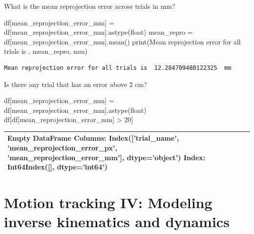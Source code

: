 \documentclass[
  letterpaper,
  DIV=11,
  numbers=noendperiod]{scrreprt}
\newenvironment{Shaded}{\begin{snugshade}}{\end{snugshade}}
\newcommand{\BuiltInTok}[1]{\textcolor[rgb]{0.00,0.23,0.31}{#1}}
\newcommand{\DecValTok}[1]{\textcolor[rgb]{0.68,0.00,0.00}{#1}}
\newcommand{\NormalTok}[1]{\textcolor[rgb]{0.00,0.23,0.31}{#1}}
\newcommand{\OperatorTok}[1]{\textcolor[rgb]{0.37,0.37,0.37}{#1}}
\newcommand{\StringTok}[1]{\textcolor[rgb]{0.13,0.47,0.30}{#1}}
\begin{document}
What is the mean reprojection error across trials in mm?

\begin{Shaded}
\begin{Highlighting}[]
\NormalTok{df[}\StringTok{\textquotesingle{}mean\_reprojection\_error\_mm\textquotesingle{}}\NormalTok{] }\OperatorTok{=}\NormalTok{ df[}\StringTok{\textquotesingle{}mean\_reprojection\_error\_mm\textquotesingle{}}\NormalTok{].astype(}\BuiltInTok{float}\NormalTok{)}
\NormalTok{mean\_repro }\OperatorTok{=}\NormalTok{ df[}\StringTok{\textquotesingle{}mean\_reprojection\_error\_mm\textquotesingle{}}\NormalTok{].mean()}
\BuiltInTok{print}\NormalTok{(}\StringTok{\textquotesingle{}Mean reprojection error for all trials is \textquotesingle{}}\NormalTok{, mean\_repro, }\StringTok{\textquotesingle{} mm\textquotesingle{}}\NormalTok{)}
\end{Highlighting}
\end{Shaded}

\begin{verbatim}
Mean reprojection error for all trials is  12.284709480122325  mm
\end{verbatim}

Is there any trial that has an error above 2 cm?

\begin{Shaded}
\begin{Highlighting}[]
\NormalTok{df[}\StringTok{\textquotesingle{}mean\_reprojection\_error\_mm\textquotesingle{}}\NormalTok{] }\OperatorTok{=}\NormalTok{ df[}\StringTok{\textquotesingle{}mean\_reprojection\_error\_mm\textquotesingle{}}\NormalTok{].astype(}\BuiltInTok{float}\NormalTok{)}
\NormalTok{df[df[}\StringTok{\textquotesingle{}mean\_reprojection\_error\_mm\textquotesingle{}}\NormalTok{] }\OperatorTok{\textgreater{}} \DecValTok{20}\NormalTok{]}
\end{Highlighting}
\end{Shaded}

\begin{tabular}{lllr}
\toprule
Empty DataFrame
Columns: Index(['trial\_name', 'mean\_reprojection\_error\_px',
       'mean\_reprojection\_error\_mm'],
      dtype='object')
Index: Int64Index([], dtype='int64') \\
\bottomrule
\end{tabular}


\chapter{Motion tracking IV: Modeling inverse kinematics and
dynamics}\label{motion-tracking-iv-modeling-inverse-kinematics-and-dynamics}
\end{document}
